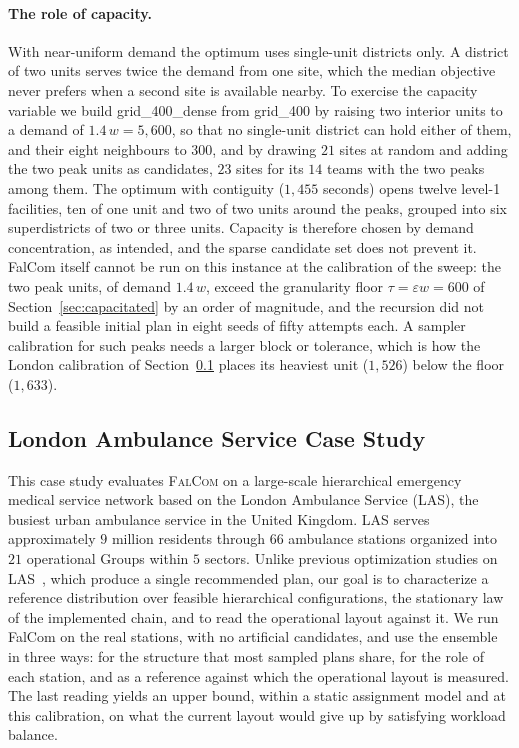 \documentclass[preprint,12pt,authoryear]{elsarticle}
\theoremstyle{definition}
\begin{document}
\paragraph{The role of capacity.}
With near-uniform demand the optimum uses single-unit districts only. A district of two units serves twice the demand from one site, which the median objective never prefers when a second site is available nearby. To exercise the capacity variable we build grid\_400\_dense from grid\_400 by raising two interior units to a demand of $1.4\,w = 5{,}600$, so that no single-unit district can hold either of them, and their eight neighbours to $300$, and by drawing $21$ sites at random and adding the two peak units as candidates, $23$ sites for its $14$ teams with the two peaks among them. The optimum with contiguity ($1{,}455$ seconds) opens twelve level-1 facilities, ten of one unit and two of two units around the peaks, grouped into six superdistricts of two or three units. Capacity is therefore chosen by demand concentration, as intended, and the sparse candidate set does not prevent it. FalCom itself cannot be run on this instance at the calibration of the sweep: the two peak units, of demand $1.4\,w$, exceed the granularity floor $\tau = \varepsilon w = 600$ of Section~\ref{sec:capacitated} by an order of magnitude, and the recursion did not build a feasible initial plan in eight seeds of fifty attempts each. A sampler calibration for such peaks needs a larger block or tolerance, which is how the London calibration of Section~\ref{sec:exp-emergency} places its heaviest unit ($1{,}526$) below the floor ($1{,}633$).


\FloatBarrier
\subsection{London Ambulance Service Case Study}
\label{sec:exp-emergency}
This case study evaluates \textsc{FalCom} on a large-scale hierarchical emergency medical service network based on the London Ambulance Service (LAS), the busiest urban ambulance service in the United Kingdom. LAS serves approximately $9$ million residents through $66$ ambulance stations organized into $21$ operational Groups within $5$ sectors. Unlike previous optimization studies on LAS~\citep{mccormack2015simulation}, which produce a single recommended plan, our goal is to characterize a reference distribution over feasible hierarchical configurations, the stationary law of the implemented chain, and to read the operational layout against it. We run FalCom on the real stations, with no artificial candidates, and use the ensemble in three ways: for the structure that most sampled plans share, for the role of each station, and as a reference against which the operational layout is measured. The last reading yields an upper bound, within a static assignment model and at this calibration, on what the current layout would give up by satisfying workload balance.
\end{document}
